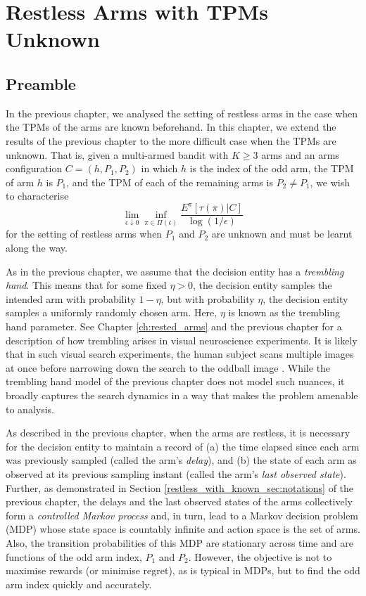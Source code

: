\chapter{Restless Arms with TPMs Unknown}
\label{ch:restless_with_unknown_TPMs}

\section{Preamble}
In the previous chapter, we analysed the setting of restless arms in the case when the TPMs of the arms are known beforehand. In this chapter, we extend the results of the previous chapter to the more difficult case when the TPMs are unknown. That is, given a multi-armed bandit with $K\geq 3$ arms and an arms configuration $C=(h, P_{1}, P_{2})$ in which $h$ is the index of the odd arm, the TPM of arm $h$ is $P_{1}$, and the TPM of each of the remaining arms is $P_{2}\neq P_{1}$, we wish to characterise $$ \lim\limits_{\epsilon\downarrow 0}  \inf\limits_{\pi\in \Pi(\epsilon)} \frac{E^{\pi}[\tau(\pi)|C]}{\log (1/\epsilon)} $$ for the setting of restless arms when $P_{1}$ and $P_{2}$ are unknown and must be learnt along the way.

As in the previous chapter, we assume that the decision entity has a {\em trembling hand}. This means that for some fixed $\eta>0$, the decision entity samples the intended arm with probability $1-\eta$, but with probability $\eta$, the decision entity samples a uniformly randomly chosen arm. Here, $\eta$ is known as the trembling hand parameter. See Chapter \ref{ch:rested_arms} and the previous chapter for a description of how trembling arises in visual neuroscience experiments. It is likely that in such visual search experiments, the human subject scans multiple images at once before narrowing down the search to the oddball image \cite{naghshvar2013two}. While the trembling hand model of the previous chapter does not model such nuances, it broadly captures the search dynamics in a way that makes the problem amenable to analysis.

As described in the previous chapter, when the arms are restless, it is necessary for the decision entity to maintain a record of (a) the time elapsed since each arm was previously sampled (called the arm’s {\em delay}), and (b) the state of each arm as observed at its previous sampling instant (called the arm's {\em last observed state}). Further, as demonstrated in Section \ref{restless_with_known_sec:notations} of the previous chapter, the delays and the last observed states of the arms collectively form a {\em  controlled Markov process} and, in turn, lead to a Markov decision problem (MDP) whose state space is countably infinite and action space is the set of arms. Also, the transition probabilities of this MDP are stationary across time and are functions of the odd arm index, $P_1$ and $P_2$. However, the objective is not to maximise rewards (or minimise regret), as is typical in MDPs, but to find the odd arm index quickly and accurately.

